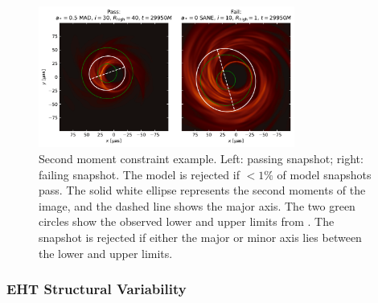 \begin{figure}
  \centering
  \includegraphics[width=0.75\textwidth]{figures/passfail_sz.pdf}
  \caption{Second moment constraint example.  Left: passing snapshot; right: failing snapshot.  The model is rejected if $< 1\%$ of model snapshots pass. The solid white ellipse  represents the second moments of the image, and the dashed line shows the major axis.  The two green circles show the observed lower and upper limits from . The snapshot is rejected if either the major or minor axis lies between the lower and upper limits.
  }
  \label{fig:passfail_sz}
\end{figure}

\subsubsection{EHT Structural Variability}

